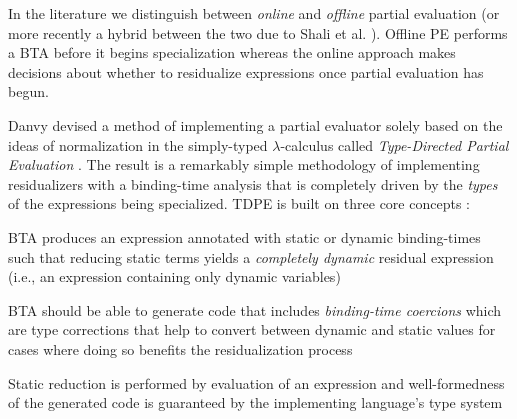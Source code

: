 \documentclass[a4paper,12pt,twoside,openright]{report}
\newenvironment{tight_enumerate}{
\begin{enumerate}
  \setlength{\itemsep}{0pt}
  \setlength{\parskip}{0pt}
}{\end{enumerate}}
\theoremstyle{definition}
\begin{document}


In the literature we distinguish between \textit{online} and \textit{offline} partial evaluation \cite{jones1993partial} (or more recently a hybrid between the two due to Shali et al. \cite{shali2011hybrid}). Offline PE performs a BTA before it begins specialization whereas the online approach makes decisions about whether to residualize expressions once partial evaluation has begun.

Danvy devised a method of implementing a partial evaluator solely based on the ideas of normalization in the simply-typed $\lambda$-calculus called \textit{Type-Directed Partial Evaluation} \cite{danvy1999type}. The result is a remarkably simple methodology of implementing residualizers with a binding-time analysis that is completely driven by the \textit{types} of the expressions being specialized. TDPE is built on three core concepts \cite{danvy1997online,grobauer2001second}:
\begin{tight_enumerate}
    \item BTA produces an expression annotated with static or dynamic binding-times such that reducing static terms yields a \textit{completely dynamic} residual expression (i.e., an expression containing only dynamic variables)
    \item BTA should be able to generate code that includes \textit{binding-time coercions} which are type corrections that help to convert between dynamic and static values for cases where doing so benefits the residualization process
    \item Static reduction is performed by evaluation of an expression and well-formedness of the generated code is guaranteed by the implementing language's type system
\end{tight_enumerate}
\end{document}
